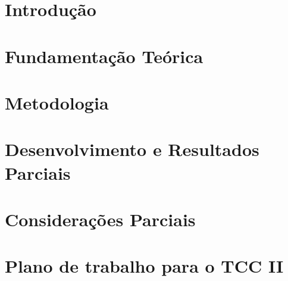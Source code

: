 \documentclass[tcc,baec]{unipampa}
\begin{document}
\tableofcontents

\chapter{Introdução}
\label{cap-introducao}


\chapter{Fundamentação Teórica}
\label{cap-fundamentacao}


\chapter{Metodologia}
\label{cap-metodologia}


\chapter{Desenvolvimento e Resultados Parciais}
\label{cap-desenvolvimento}


\chapter{Considerações Parciais}
\label{cap-conclusao}





\appendix

\chapter{Plano de trabalho para o TCC II}
\label{ap-plano-tcc2}

\end{document}
